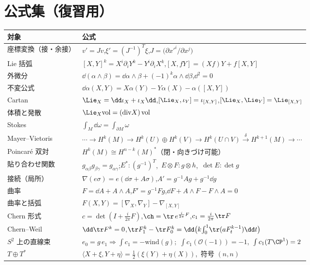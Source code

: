 \section*{公式集（復習用）}
\begin{center}
\renewcommand{\arraystretch}{1.35}
\begin{tabular}{p{}p{}}
\toprule
対象 & 公式\\
\midrule
座標変換（接・余接） & $v'=Jv$,\quad $\xi'=(J^{-1})^T\xi$,\quad $J=\bigl(\partial x'^i/\partial x^j\bigr)$\\
Lie 括弧 & $[X,Y]^k=X^i\partial_iY^k-Y^i\partial_iX^k$,\quad $[X,fY]=(Xf)Y+f[X,Y]$\\
外微分 & $\dd(\alpha\wedge\beta)=\dd\alpha\wedge\beta+(-1)^k\alpha\wedge\dd\beta$,\quad $\dd^2=0$\\
不変公式 & $\dd\alpha(X,Y)=X\alpha(Y)-Y\alpha(X)-\alpha([X,Y])$\\
Cartan & $\Lie_X=\dd\iota_X+\iota_X\dd$,\quad $[\Lie_X,\iota_Y]=\iota_{[X,Y]}$,\quad $[\Lie_X,\Lie_Y]=\Lie_{[X,Y]}$\\
体積と発散 & $\Lie_X\mathrm{vol}=(\mathrm{div}X)\,\mathrm{vol}$\\
Stokes & $\int_M\dd\omega=\int_{\partial M}\omega$\\
Mayer--Vietoris & $\cdots\to H^k(M)\to H^k(U)\oplus H^k(V)\to H^k(U\cap V)\xrightarrow{\delta}H^{k+1}(M)\to\cdots$\\
Poincar\'e 双対 & $H^k(M)\cong H^{n-k}(M)^*$（閉・向きづけ可能）\\
貼り合わせ関数 & $g_{\alpha\beta}g_{\beta\gamma}=g_{\alpha\gamma}$;\quad $E^*:(g^{-1})^T$,\ $E\otimes F:g\otimes h$,\ $\det E:\det g$\\
接続（局所） & $\nabla(e\sigma)=e(\dd\sigma+A\sigma)$,\quad $A'=g^{-1}Ag+g^{-1}\dd g$\\
曲率 & $F=\dd A+A\wedge A$,\quad $F'=g^{-1}Fg$,\quad $\dd F+A\wedge F-F\wedge A=0$\\
曲率と括弧 & $F(X,Y)=[\nabla_X,\nabla_Y]-\nabla_{[X,Y]}$\\
Chern 形式 & $c=\det(I+\frac i{2\pi}F)$,\quad $\ch=\tr\,e^{\frac i{2\pi}F}$,\quad $c_1=\frac i{2\pi}\tr F$\\
Chern--Weil & $\dd\tr F^k=0$,\quad $\tr F_1^k-\tr F_0^k=\dd\bigl(k\!\int_0^1\!\tr(aF_t^{k-1})\dd t\bigr)$\\
$S^2$ 上の直線束 & $e_0=g\,e_1\Rightarrow\int c_1=-\mathrm{wind}(g)$;\ $\int c_1(\mathcal O(-1))=-1$,\ $\int c_1(T\CP^1)=2$\\
$T\oplus T^*$ & $\langle X+\xi,Y+\eta\rangle=\frac12(\xi(Y)+\eta(X))$,\ 符号 $(n,n)$\\
\bottomrule
\end{tabular}
\end{center}

